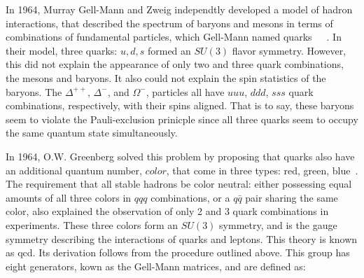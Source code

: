 \par In 1964, Murray Gell-Mann and Zweig independtly developed a model
of hadron interactions, that described the spectrum of baryons and
mesons in terms of combinations of fundamental particles, which
Gell-Mann named
quarks~\cite{th:GellMann_QuarkModel}~\cite{th:Zweig_QuarkModel1}~\cite{th:Zweig_QuarkModel2}.
In their model, three quarks: $u, d, s$ formed an $SU(3)$ flavor
symmetry.  However, this did not explain the appearance of only two
and three quark combinations, the mesons and baryons.  It also could
not explain the spin statistics of the baryons.  The $\Delta^{++}$,
$\Delta^{-}$, and $\Omega^{-}$, particles all have $uuu$, $ddd$, $sss$
quark combinations, respectively, with their spins aligned.  That is
to say, these baryons seem to violate the Pauli-exclusion prinicple
since all three quarks seem to occupy the same quantum state
simultaneously.   

\par  In 1964, O.W. Greenberg solved this problem by proposing that quarks also have
an additional quantum number, $color$, that come in three types: red,
green, blue~\cite{th:Greenberg_color}.  The requirement that all
stable hadrons be color neutral: either possessing equal amounts of
all three colors in $qqq$ combinations, or a $q\bar{q}$ pair sharing the
same color, also explained the observation of only 2 and 3 quark
combinations in experiments.  These three colors form an
$SU(3)$ symmetry, and is the gauge symmetry describing the
interactions of quarks and leptons.  This theory is known as
\acrfull{qcd}.  Its derivation follows from the procedure outlined
above.  This group has eight generators, kown as the Gell-Mann
matrices, and are defined as: 

